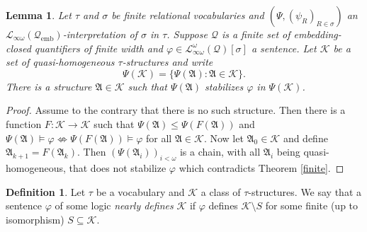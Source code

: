 \documentclass{ndjflart}
\theoremstyle{plain}
\newtheorem{lemma}[conjecture]{Lemma}
\theoremstyle{definition}
\newtheorem{definition}[conjecture]{Definition}
\numberwithin{equation}{section}
\DeclareMathOperator{\emb}{emb}
\begin{document}
\begin{lemma}\label{stabil}
Let $\tau$ and $\sigma$ be finite relational vocabularies and
$(\Psi, (\psi_R)_{R \in \sigma})$ an
$\mathcal{L}_{\infty \omega}(\mathcal{Q}_{\emb})$-interpretation of $\sigma$ in
$\tau$.
Suppose $\mathcal{Q}$ is a finite set of embedding-closed quantifiers of finite width
and $\varphi \in \mathcal{L}_{\infty\omega}^{\omega}(\mathcal{Q})[\sigma]$ a sentence.
Let $\mathcal{K}$ be a set of quasi-homogeneous $\tau$-structures and write
\[
	\Psi(\mathcal{K}) = \{\Psi(\mathfrak{A}) \colon \mathfrak{A} \in \mathcal{K}\}.
\]
There is a structure $\mathfrak{A} \in \mathcal{K}$ such that $\Psi(\mathfrak{A})$
stabilizes $\varphi$ in $\Psi(\mathcal{K})$.
\end{lemma}
\begin{proof}
Assume to the contrary that there is no such structure.
Then there is a function $F : \mathcal{K} \rightarrow \mathcal{K}$ such that
$\Psi(\mathfrak{A}) \leq \Psi(F(\mathfrak{A}))$ and
$\Psi(\mathfrak{A}) \vDash\varphi \nLeftrightarrow \Psi(F(\mathfrak{A})) \vDash \varphi$
for all $\mathfrak{A} \in \mathcal{K}$.
Now let $\mathfrak{A}_0 \in \mathcal{K}$ and define
$\mathfrak{A}_{k+1} = F(\mathfrak{A}_k)$.
Then $(\Psi(\mathfrak{A}_i))_{i<\omega}$ is a chain, with all $\mathfrak{A}_i$
being quasi-homogeneous, that does not stabilize $\varphi$ which contradicts
Theorem \ref{finite}.
\end{proof}

\begin{definition}
Let $\tau$ be a vocabulary and $\mathcal{K}$ a class of $\tau$-structures.
We say that a sentence $\varphi$ of some logic \emph{nearly defines}
$\mathcal{K}$ if $\varphi$ defines $\mathcal{K} \setminus S$ for some finite
(up to isomorphism) $S \subseteq \mathcal{K}$.
\end{definition}
\end{document}
